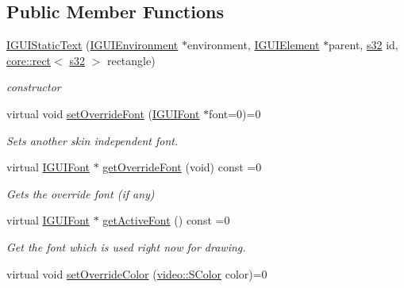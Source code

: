 \subsection*{Public Member Functions}
\begin{DoxyCompactItemize}
\item 
\mbox{\label{classirr_1_1gui_1_1IGUIStaticText_a80f93a4419ad85a0f9aadfbdd26aa87d}} 
\hyperlink{classirr_1_1gui_1_1IGUIStaticText_a80f93a4419ad85a0f9aadfbdd26aa87d}{I\+G\+U\+I\+Static\+Text} (\hyperlink{classirr_1_1gui_1_1IGUIEnvironment}{I\+G\+U\+I\+Environment} $\ast$environment, \hyperlink{classirr_1_1gui_1_1IGUIElement}{I\+G\+U\+I\+Element} $\ast$parent, \hyperlink{namespaceirr_ac66849b7a6ed16e30ebede579f9b47c6}{s32} id, \hyperlink{classirr_1_1core_1_1rect}{core\+::rect}$<$ \hyperlink{namespaceirr_ac66849b7a6ed16e30ebede579f9b47c6}{s32} $>$ rectangle)
\begin{DoxyCompactList}\small\item\em constructor \end{DoxyCompactList}\item 
virtual void \hyperlink{classirr_1_1gui_1_1IGUIStaticText_ae3f65780d10979eb323ee7310cff7396}{set\+Override\+Font} (\hyperlink{classirr_1_1gui_1_1IGUIFont}{I\+G\+U\+I\+Font} $\ast$font=0)=0
\begin{DoxyCompactList}\small\item\em Sets another skin independent font. \end{DoxyCompactList}\item 
virtual \hyperlink{classirr_1_1gui_1_1IGUIFont}{I\+G\+U\+I\+Font} $\ast$ \hyperlink{classirr_1_1gui_1_1IGUIStaticText_a581f18f3ffe650246125988b3b7dc44e}{get\+Override\+Font} (void) const =0
\begin{DoxyCompactList}\small\item\em Gets the override font (if any) \end{DoxyCompactList}\item 
virtual \hyperlink{classirr_1_1gui_1_1IGUIFont}{I\+G\+U\+I\+Font} $\ast$ \hyperlink{classirr_1_1gui_1_1IGUIStaticText_aef001eb5d0e13b5b6d1efead606605c2}{get\+Active\+Font} () const =0
\begin{DoxyCompactList}\small\item\em Get the font which is used right now for drawing. \end{DoxyCompactList}\item 
virtual void \hyperlink{classirr_1_1gui_1_1IGUIStaticText_aadc1f0e10e4b298944e6dcfd49e54009}{set\+Override\+Color} (\hyperlink{classirr_1_1video_1_1SColor}{video\+::\+S\+Color} color)=0

\end{DoxyCompactItemize}
